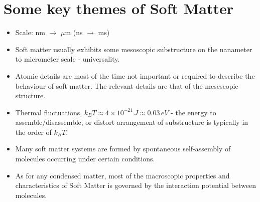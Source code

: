 \documentclass[a4paper, 11pt, normalem]{report}
\begin{document}
\section{Some key themes of Soft Matter}
\begin{itemize}
    \item Scale: nm $\to$ $\mu$m (ns $\to$ ms)
    \item Soft matter usually exhibits some mesoscopic substructure on the nanameter to micrometer scale - universality.
    \item Atomic details are most of the time not important or required to describe the behaviour of soft matter.
    The relevant details are that of the mesescopic structure.
    \item Thermal fluctuations, $k_BT \approx 4\times10^{-21}\,J \approx 0.03\,eV$ - the energy to assemble/disassemble, or distort arrangement of substructure is typically in the order of $k_BT$.
    \item Many soft matter systems are formed by spontaneous self-assembly of molecules occurring under certain conditions.
    \item As for any condensed matter, most of the macroscopic properties and characteristics of Soft Matter is governed by the interaction potential between molecules.
\end{itemize}
\end{document}
